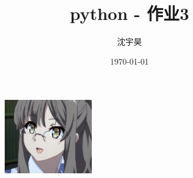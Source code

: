 \documentclass{beamer}
\author{沈宇昊}
\title{python - 作业3}
\date{\today}
\institute{兰州理工大学}
\begin{document}

  

  \begin{frame}[plain]
    \maketitle
    \begin{figure}[htbp] %
    \centering %
    \includegraphics[width=0.35\textwidth,height=0.3\textwidth]{graph/shuangye12.jpg} %
    \end{figure}
  \end{frame}
\end{document}
